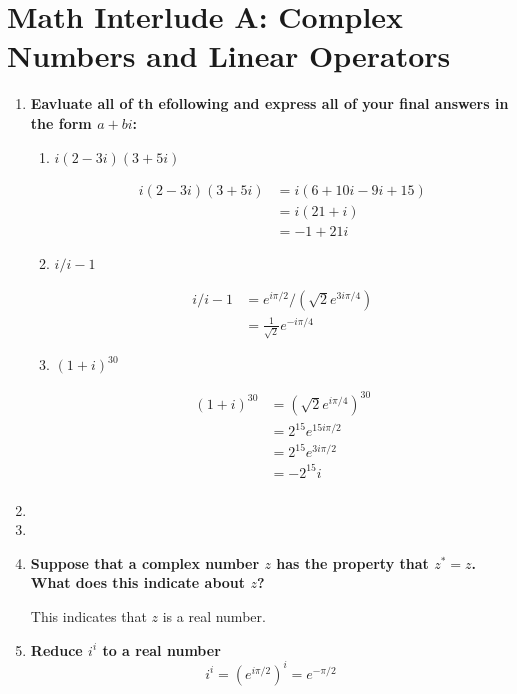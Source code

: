 \documentclass[9pt]{report}
\begin{document}
  \chapter{Math Interlude A: Complex Numbers and Linear Operators}
  \begin{enumerate}
    \item \textbf{Eavluate all of th efollowing and express all of your final
      answers in the form $a + bi$:}
        \begin{enumerate}
          \item $i (2-3i)(3 + 5i)$

            \[
              \begin{align}
                i (2-3i)(3 + 5i) &= i (6 + 10i - 9i + 15) \\
                                 &= i (21 + i)\\
                                 &= -1 + 21i
              \end{align}
            \]

      \item $ i/i-1 $

      \[
        \begin{align}
            i/i-1 &= e^{i\pi/2} / (\sqrt{2} e^{3i\pi/4})\\
                  &= \frac{1}{\sqrt{2}} e^{-i\pi/4}
        \end{align}
      \]

    \item $(1 + i)^{30}$

      \[
      \begin{align}
        (1 + i)^{30} &= (\sqrt{2} e^{i\pi/4})^{30}\\
                     &= 2^{15} e^{15i\pi/2}\\
                     &= 2^{15} e^{3i\pi/2} \\
                     &= -2^{15} i\\
      \end{align}
    \]
        \end{enumerate}
      \item
      \item
      \item \textbf{Suppose that a complex number $z$ has the property that $z^* = z$. What does this indicate about $z$?}

        This indicates that $z$ is a real number.

      \item \textbf{Reduce $i^i$ to a real number}
        \[
          i^i = (e^{i\pi/2})^i = e^{-\pi/2}

\]
\end{enumerate}
\end{document}
